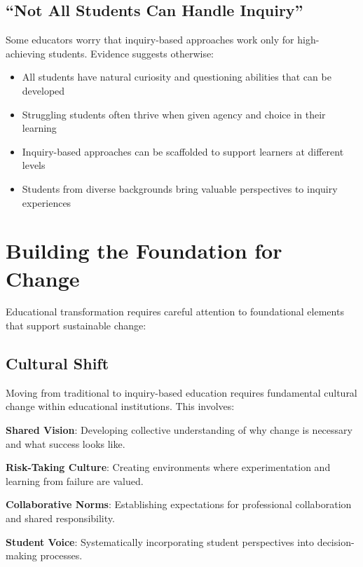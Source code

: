 \documentclass[
  Letterpaper,
]{scrbook}
\providecommand{\tightlist}{%
  \setlength{\itemsep}{0pt}\setlength{\parskip}{0pt}}\usepackage{longtable,booktabs,array}
\begin{document}
\subsection{``Not All Students Can Handle
Inquiry''}\label{not-all-students-can-handle-inquiry}

Some educators worry that inquiry-based approaches work only for
high-achieving students. Evidence suggests otherwise:

\begin{itemize}
\tightlist
\item
  All students have natural curiosity and questioning abilities that can
  be developed
\item
  Struggling students often thrive when given agency and choice in their
  learning
\item
  Inquiry-based approaches can be scaffolded to support learners at
  different levels
\item
  Students from diverse backgrounds bring valuable perspectives to
  inquiry experiences
\end{itemize}

\section{Building the Foundation for
Change}\label{building-the-foundation-for-change}

Educational transformation requires careful attention to foundational
elements that support sustainable change:

\subsection{Cultural Shift}\label{cultural-shift}

Moving from traditional to inquiry-based education requires fundamental
cultural change within educational institutions. This involves:

\textbf{Shared Vision}: Developing collective understanding of why
change is necessary and what success looks like.

\textbf{Risk-Taking Culture}: Creating environments where
experimentation and learning from failure are valued.

\textbf{Collaborative Norms}: Establishing expectations for professional
collaboration and shared responsibility.

\textbf{Student Voice}: Systematically incorporating student
perspectives into decision-making processes.
\end{document}
